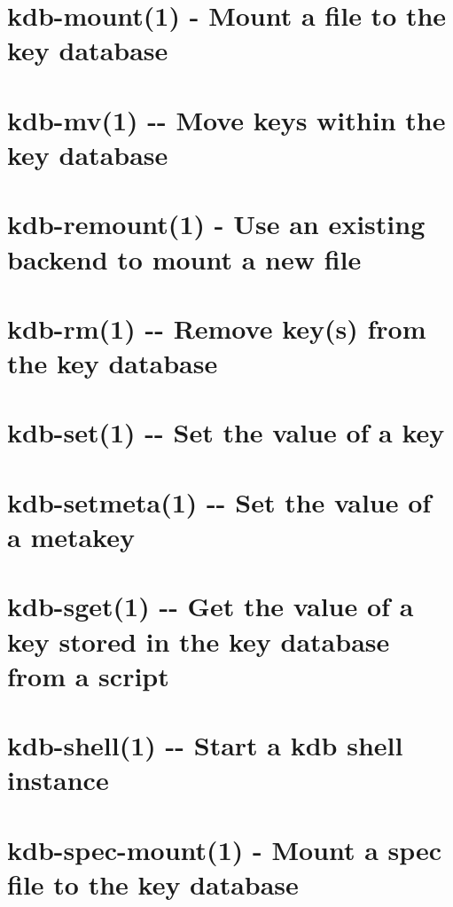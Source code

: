 \documentclass[twoside]{book}
\newcommand{\+}{\discretionary{\mbox{\scriptsize$\hookleftarrow$}}{}{}}
\begin{document}
\chapter{kdb-\/mount(1) -\/ Mount a file to the key database}
\label{md_doc_help_kdb-mount}
\hypertarget{md_doc_help_kdb-mount}{}

\chapter{kdb-\/mv(1) -\/-\/ Move keys within the key database}
\label{md_doc_help_kdb-mv}
\hypertarget{md_doc_help_kdb-mv}{}

\chapter{kdb-\/remount(1) -\/ Use an existing backend to mount a new file}
\label{md_doc_help_kdb-remount}
\hypertarget{md_doc_help_kdb-remount}{}

\chapter{kdb-\/rm(1) -\/-\/ Remove key(s) from the key database}
\label{md_doc_help_kdb-rm}
\hypertarget{md_doc_help_kdb-rm}{}

\chapter{kdb-\/set(1) -\/-\/ Set the value of a key}
\label{md_doc_help_kdb-set}
\hypertarget{md_doc_help_kdb-set}{}

\chapter{kdb-\/setmeta(1) -\/-\/ Set the value of a metakey}
\label{md_doc_help_kdb-setmeta}
\hypertarget{md_doc_help_kdb-setmeta}{}

\chapter{kdb-\/sget(1) -\/-\/ Get the value of a key stored in the key database from a script}
\label{md_doc_help_kdb-sget}
\hypertarget{md_doc_help_kdb-sget}{}

\chapter{kdb-\/shell(1) -\/-\/ Start a kdb shell instance}
\label{md_doc_help_kdb-shell}
\hypertarget{md_doc_help_kdb-shell}{}

\chapter{kdb-\/spec-\/mount(1) -\/ Mount a spec file to the key database}
\label{md_doc_help_kdb-spec-mount}
\hypertarget{md_doc_help_kdb-spec-mount}{}

\end{document}
